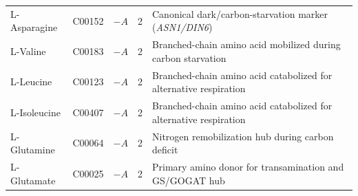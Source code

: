 \documentclass[preprint,11pt,numbers,sort&compress]{elsarticle}
\begin{document}
\begin{table}[htbp]
{\begin{tabular}{llllp{5.2cm}}
L-Asparagine & C00152 & $-A$ & 2 & Canonical dark/carbon-starvation marker (\textit{ASN1/DIN6}) \\
L-Valine & C00183 & $-A$ & 2 & Branched-chain amino acid mobilized during carbon starvation \\
L-Leucine & C00123 & $-A$ & 2 & Branched-chain amino acid catabolized for alternative respiration \\
L-Isoleucine & C00407 & $-A$ & 2 & Branched-chain amino acid catabolized for alternative respiration \\
L-Glutamine & C00064 & $-A$ & 2 & Nitrogen remobilization hub during carbon deficit \\
L-Glutamate & C00025 & $-A$ & 2 & Primary amino donor for transamination and GS/GOGAT hub \\
\bottomrule
\end{tabular}%
}
\end{table}
\end{document}
